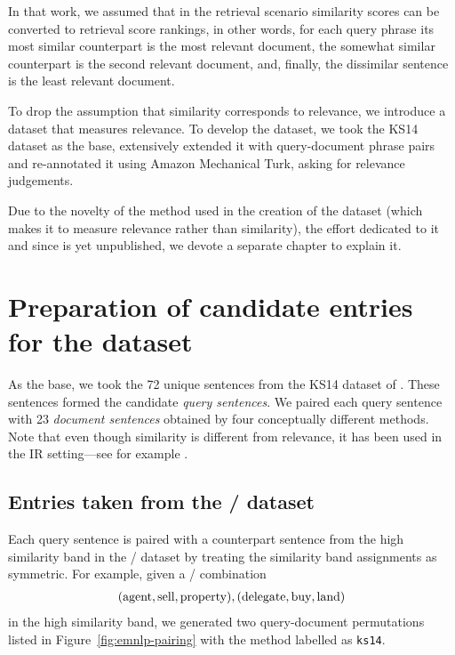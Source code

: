 In that work, we assumed that in the retrieval scenario similarity scores can be converted to retrieval score rankings, in other words, for each query phrase its most similar counterpart is the most relevant document, the somewhat similar counterpart is the second relevant document, and, finally, the dissimilar sentence is the least relevant document.

To drop the assumption that similarity corresponds to relevance, we introduce a dataset that measures relevance. To develop the dataset, we took the KS14 dataset as the base, extensively extended it with query-document phrase pairs and re-annotated it using Amazon Mechanical Turk, asking for relevance judgements.

Due to the novelty of the method used in the creation of the dataset (which makes it to measure relevance rather than similarity), the effort dedicated to it and since is yet unpublished, we devote a separate chapter to explain it.

\section{Preparation of candidate entries for the dataset}
\label{sec:design}

As the base, we took the 72 unique sentences from the KS14 dataset of .\footnotemark{} These sentences formed the candidate \emph{query sentences}. We paired each query sentence with 23 \emph{document sentences} obtained by four conceptually different methods. Note that even though similarity is different from relevance, it has been used in the IR setting---see for example .
%



\subsection{Entries taken from the \emnlp/ dataset}

Each query sentence is paired with a counterpart sentence from the high similarity band\footnotemark{} in the \emnlp/ dataset by treating the similarity band assignments as symmetric. For example, given a \emnlp/ combination
%
%
\begin{eqnarray*}
(\textmd{agent}, \textmd{sell}, \textmd{property}),
(\textmd{delegate}, \textmd{buy}, \textmd{land})
\end{eqnarray*}
%
in the high similarity band, we generated two query-document permutations listed
in Figure~\ref{fig:emnlp-pairing} with the method labelled as \texttt{ks14}.

